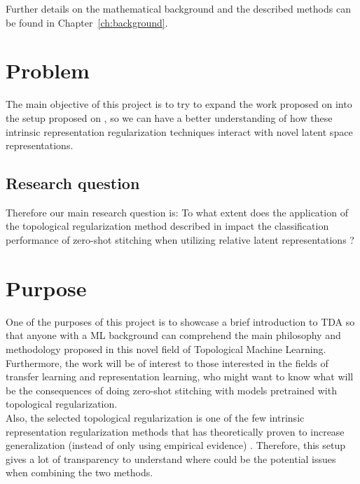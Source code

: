 \documentclass[../main.tex]{subfiles}
\begin{document}
Further details on the mathematical background and the described methods can be found in Chapter~\ref{ch:background}.

\section{Problem}
\label{sec:problem}


The main objective of this project is to try to expand the work proposed on \cite{hofer_densified_2021} into the setup proposed on \cite{moschella_relative_2022}, so we can have a better understanding of how these intrinsic representation regularization techniques interact with novel latent space representations.

\subsection{Research question}
\label{sec:researchQuestion}

Therefore our main research question is: To what extent does the application of the topological regularization method described in \cite{hofer_densified_2021} impact the classification performance of zero-shot stitching when utilizing relative latent representations \cite{moschella_relative_2022}?

\section{Purpose}

One of the purposes of this project is to showcase a brief introduction to TDA so that anyone with a ML background can comprehend the main philosophy and methodology proposed in this novel field of Topological Machine Learning. Furthermore, the work will be of interest to those interested in the fields of transfer learning and representation learning, who might want to know what will be the consequences of doing zero-shot stitching with models pretrained with topological regularization.\\

Also, the selected topological regularization is one of the few intrinsic representation regularization methods that has theoretically proven to increase generalization (instead of only using empirical evidence) \cite{hofer_densified_2021}. Therefore, this setup gives a lot of transparency to understand where could be the potential issues when combining the two methods.
\end{document}
